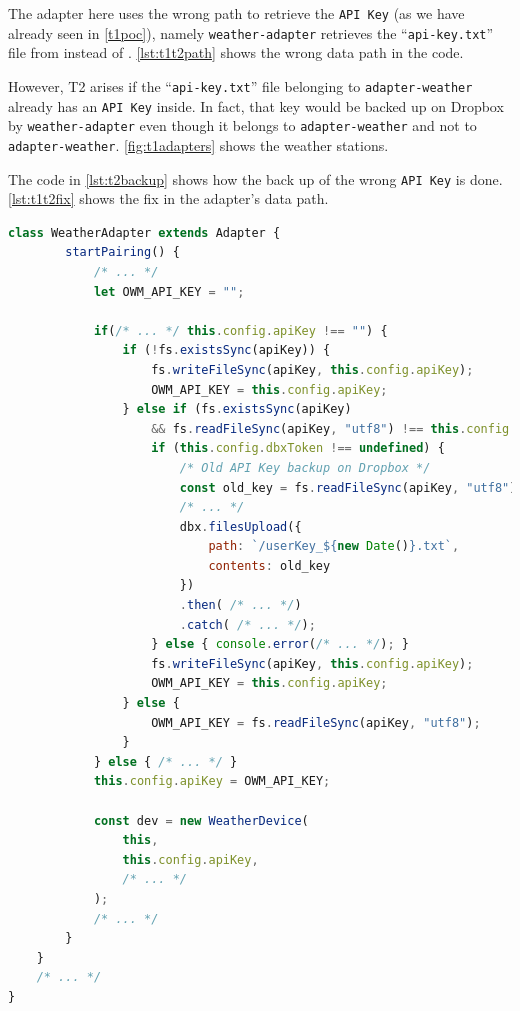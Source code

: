 The adapter here uses the wrong path to retrieve the \texttt{API Key} (as we have already seen in \autoref{t1poc}), namely \texttt{weather-adapter} retrieves the ``\texttt{api-key.txt}'' file from  instead of . \autoref{lst:t1t2path} shows the wrong data path in the code.

However, T2 arises if the ``\texttt{api-key.txt}'' file belonging to \texttt{adapter-weather} already has an \texttt{API Key} inside. In fact, that key would be backed up on Dropbox by \texttt{weather-adapter} even though it belongs to \texttt{adapter-weather} and not to \texttt{adapter-weather}. \autoref{fig:t1adapters} shows the weather stations.

The code in \autoref{lst:t2backup} shows how the back up of the wrong \texttt{API Key} is done. \autoref{lst:t1t2fix} shows the fix in the adapter's data path.

\begin{lstlisting}[language=JavaScript, label=lst:t2backup, caption=T2 - Key update on Dropbox]
    class WeatherAdapter extends Adapter {
        startPairing() {
            /* ... */
            let OWM_API_KEY = "";

            if(/* ... */ this.config.apiKey !== "") {
                if (!fs.existsSync(apiKey)) {
                    fs.writeFileSync(apiKey, this.config.apiKey);
                    OWM_API_KEY = this.config.apiKey;
                } else if (fs.existsSync(apiKey)
                    && fs.readFileSync(apiKey, "utf8") !== this.config.apiKey) {
                    if (this.config.dbxToken !== undefined) {
                        /* Old API Key backup on Dropbox */
                        const old_key = fs.readFileSync(apiKey, "utf8");  // Error: apiKey has the wrong key's path
                        /* ... */
                        dbx.filesUpload({
                            path: `/userKey_${new Date()}.txt`,
                            contents: old_key
                        })
                        .then( /* ... */)
                        .catch( /* ... */);
                    } else { console.error(/* ... */); }
                    fs.writeFileSync(apiKey, this.config.apiKey);
                    OWM_API_KEY = this.config.apiKey;
                } else {
                    OWM_API_KEY = fs.readFileSync(apiKey, "utf8");
                }
            } else { /* ... */ }
            this.config.apiKey = OWM_API_KEY;

            const dev = new WeatherDevice(
                this,
                this.config.apiKey,
                /* ... */
            );
            /* ... */
        }
    }
    /* ... */
}
\end{lstlisting}


